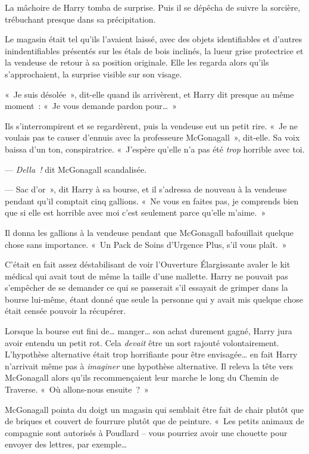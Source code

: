 La mâchoire de Harry tomba de surprise. Puis il se dépêcha de suivre la sorcière, trébuchant presque dans sa précipitation.

\later

Le magasin était tel qu'ils l'avaient laissé, avec des objets identifiables et d'autres inindentifiables présentés sur les étals de bois inclinés, la lueur grise protectrice et la vendeuse de retour à sa position originale.
Elle les regarda alors qu'ils s'approchaient, la surprise visible sur son visage.

«~Je suis désolée~», dit-elle quand ils arrivèrent, et Harry dit presque au même moment~: «~Je vous demande pardon pour…~»

Ils s'interrompirent et se regardèrent, puis la vendeuse eut un petit rire.
«~Je ne voulais pas te causer d'ennuis avec la professeure McGonagall~», dit-elle.
Sa voix baissa d'un ton, conspiratrice.
«~J'espère qu'elle n'a pas été \emph{trop} horrible avec toi.

--- \emph{Della~!} dit McGonagall scandalisée.

--- Sac d'or~», dit Harry à sa bourse, et il s'adressa de nouveau à la vendeuse pendant qu'il comptait cinq gallions.
«~Ne vous en faites pas, je comprends bien que si elle est horrible avec moi c'est seulement parce qu'elle m'aime.~»

Il donna les gallions à la vendeuse pendant que McGonagall bafouillait quelque chose sans importance.
«~Un Pack de Soins d'Urgence Plus, s'il vous plaît.~»

C'était en fait assez déstabilisant de voir l'Ouverture Élargissante avaler le kit médical qui avait tout de même la taille d'une mallette.
Harry ne pouvait pas s'empêcher de se demander ce qui se passerait s'il essayait de grimper dans la bourse lui-même, étant donné que seule la personne qui y avait mis quelque chose était censée pouvoir la récupérer.

Lorsque la bourse eut fini de… manger… son achat durement gagné, Harry jura avoir entendu un petit rot.
Cela \emph{devait} être un sort rajouté volontairement.
L'hypothèse alternative était trop horrifiante pour être envisagée… en fait Harry n'arrivait même pas à \emph{imaginer} une hypothèse alternative.
Il releva la tête vers McGonagall alors qu'ils recommençaient leur marche le long du Chemin de Traverse. «~Où allons-nous ensuite~?~»

McGonagall pointa du doigt un magasin qui semblait être fait de chair plutôt que de briques et couvert de fourrure plutôt que de peinture.
«~Les petits animaux de compagnie sont autorisés à Poudlard -- vous pourriez avoir une chouette pour envoyer des lettres, par exemple…

